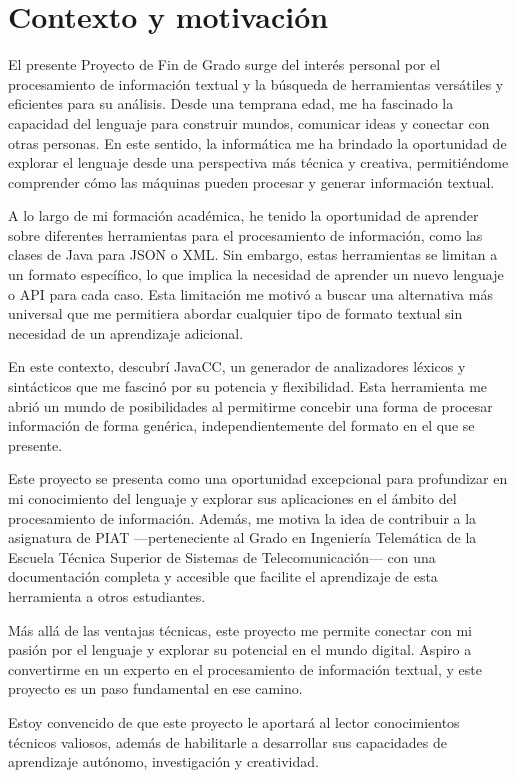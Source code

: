 \section{Contexto y motivación}
El presente Proyecto de Fin de Grado surge del interés personal por el procesamiento de información textual y la búsqueda de herramientas versátiles y eficientes para su análisis. Desde una temprana edad, me ha fascinado la capacidad del lenguaje para construir mundos, comunicar ideas y conectar con otras personas. En este sentido, la informática me ha brindado la oportunidad de explorar el lenguaje desde una perspectiva más técnica y creativa, permitiéndome comprender cómo las máquinas pueden procesar y generar información textual.

A lo largo de mi formación académica, he tenido la oportunidad de aprender sobre diferentes herramientas para el procesamiento de información, como las clases de Java para JSON o XML. Sin embargo, estas herramientas se limitan a un formato específico, lo que implica la necesidad de aprender un nuevo lenguaje o API para cada caso. Esta limitación me motivó a buscar una alternativa más universal que me permitiera abordar cualquier tipo de formato textual sin necesidad de un aprendizaje adicional.

En este contexto, descubrí JavaCC, un generador de analizadores léxicos y sintácticos que me fascinó por su potencia y flexibilidad\cite{javaccgithub}. Esta herramienta me abrió un mundo de posibilidades al permitirme concebir una forma de procesar información de forma genérica, independientemente del formato en el que se presente.

Este proyecto se presenta como una oportunidad excepcional para profundizar en mi conocimiento del lenguaje y explorar sus aplicaciones en el ámbito del procesamiento de información. Además, me motiva la idea de contribuir a la asignatura de PIAT ---perteneciente al Grado en Ingeniería Telemática de la Escuela Técnica Superior de Sistemas de Telecomunicación--- con una documentación completa y accesible que facilite el aprendizaje de esta herramienta a otros estudiantes.

Más allá de las ventajas técnicas, este proyecto me permite conectar con mi pasión por el lenguaje y explorar su potencial en el mundo digital. Aspiro a convertirme en un experto en el procesamiento de información textual, y este proyecto es un paso fundamental en ese camino.

Estoy convencido de que este proyecto le aportará al lector conocimientos técnicos valiosos, además de habilitarle a desarrollar sus capacidades de aprendizaje autónomo, investigación y creatividad. 

